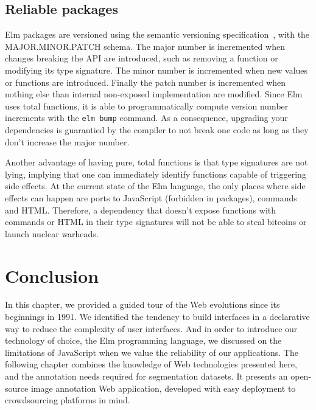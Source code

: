 


\subsection{Reliable packages}%
\label{sub:reliable_packages}


Elm packages are versioned using
the semantic versioning specification~\cite{semanticversioning},
with the MAJOR.MINOR.PATCH schema.
The major number is incremented when changes breaking the API are introduced,
such as removing a function or modifying its type signature.
The minor number is incremented when new values or functions are introduced.
Finally the patch number is incremented when nothing else than internal
non-exposed implementation are modified.
Since Elm uses total functions, it is able to programmatically compute
version number increments with the \verb|elm bump| command.
As a consequence, upgrading your dependencies is guarantied by the compiler
to not break one code as long as they don't increase the major number.

Another advantage of having pure, total functions is that type signatures are not lying,
implying that one can immediately identify functions capable of triggering side effects.
At the current state of the Elm language,
the only places where side effects can happen are
ports to JavaScript (forbidden in packages), commands and HTML.
Therefore, a dependency that doesn't expose functions with commands or HTML
in their type signatures will not be able to steal bitcoins or launch nuclear warheads.

\section*{Conclusion}%
\label{sec:web-conclusion}

In this chapter, we provided a guided tour of the Web evolutions
since its beginnings in 1991.
We identified the tendency to build interfaces in a declarative way
to reduce the complexity of user interfaces.
And in order to introduce our technology of choice, the Elm programming language,
we discussed on the limitations of JavaScript when we value
the reliability of our applications.
The following chapter combines the knowledge of Web technologies presented here,
and the annotation needs required for segmentation datasets.
It presents an open-source image annotation Web application,
developed with easy deployment to crowdsourcing platforms in mind.
